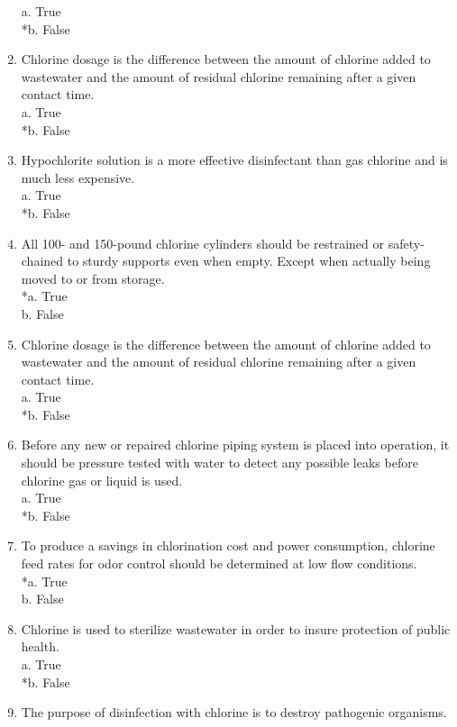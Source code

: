 \begin{enumerate}
a. True \\
*b. False \\
\item Chlorine dosage is the difference between the amount of chlorine added to wastewater and the amount of residual chlorine remaining after a given contact time. \\
a. True \\
*b. False \\
\item Hypochlorite solution is a more effective disinfectant than gas chlorine and is much less expensive. \\
a. True \\
*b. False \\
\item All 100- and 150-pound chlorine cylinders should be restrained or safety-chained to sturdy supports even when empty. Except when actually being moved to or from storage. \\
*a. True \\
b. False \\
\item Chlorine dosage is the difference between the amount of chlorine added to wastewater and the amount of residual chlorine remaining after a given contact time. \\
a. True \\
*b. False \\
\item Before any new or repaired chlorine piping system is placed into operation, it should be pressure tested with water to detect any possible leaks before chlorine gas or liquid is used. \\
a. True \\
*b. False \\
\item To produce a savings in chlorination cost and power consumption, chlorine feed rates for odor control should be determined at low flow conditions. \\
*a. True \\
b. False \\
\item Chlorine is used to sterilize wastewater in order to insure protection of public health. \\
a. True \\
*b. False \\
\item The purpose of disinfection with chlorine is to destroy pathogenic organisms. \\

\end{enumerate}
